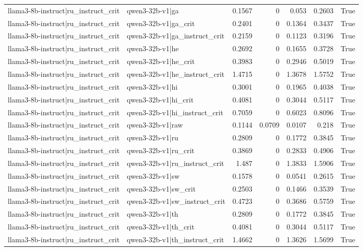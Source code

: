 \begin{table}
\begin{tabular}{l l r r r r l}
llama3-8b-instruct|ru_instruct_crit & qwen3-32b-v1|ga & 0.1567 & 0 & 0.053 & 0.2603 & True \\
llama3-8b-instruct|ru_instruct_crit & qwen3-32b-v1|ga_crit & 0.2401 & 0 & 0.1364 & 0.3437 & True \\
llama3-8b-instruct|ru_instruct_crit & qwen3-32b-v1|ga_instruct_crit & 0.2159 & 0 & 0.1123 & 0.3196 & True \\
llama3-8b-instruct|ru_instruct_crit & qwen3-32b-v1|he & 0.2692 & 0 & 0.1655 & 0.3728 & True \\
llama3-8b-instruct|ru_instruct_crit & qwen3-32b-v1|he_crit & 0.3983 & 0 & 0.2946 & 0.5019 & True \\
llama3-8b-instruct|ru_instruct_crit & qwen3-32b-v1|he_instruct_crit & 1.4715 & 0 & 1.3678 & 1.5752 & True \\
llama3-8b-instruct|ru_instruct_crit & qwen3-32b-v1|hi & 0.3001 & 0 & 0.1965 & 0.4038 & True \\
llama3-8b-instruct|ru_instruct_crit & qwen3-32b-v1|hi_crit & 0.4081 & 0 & 0.3044 & 0.5117 & True \\
llama3-8b-instruct|ru_instruct_crit & qwen3-32b-v1|hi_instruct_crit & 0.7059 & 0 & 0.6023 & 0.8096 & True \\
llama3-8b-instruct|ru_instruct_crit & qwen3-32b-v1|raw & 0.1144 & 0.0709 & 0.0107 & 0.218 & True \\
llama3-8b-instruct|ru_instruct_crit & qwen3-32b-v1|ru & 0.2809 & 0 & 0.1772 & 0.3845 & True \\
llama3-8b-instruct|ru_instruct_crit & qwen3-32b-v1|ru_crit & 0.3869 & 0 & 0.2833 & 0.4906 & True \\
llama3-8b-instruct|ru_instruct_crit & qwen3-32b-v1|ru_instruct_crit & 1.487 & 0 & 1.3833 & 1.5906 & True \\
llama3-8b-instruct|ru_instruct_crit & qwen3-32b-v1|sw & 0.1578 & 0 & 0.0541 & 0.2615 & True \\
llama3-8b-instruct|ru_instruct_crit & qwen3-32b-v1|sw_crit & 0.2503 & 0 & 0.1466 & 0.3539 & True \\
llama3-8b-instruct|ru_instruct_crit & qwen3-32b-v1|sw_instruct_crit & 0.4723 & 0 & 0.3686 & 0.5759 & True \\
llama3-8b-instruct|ru_instruct_crit & qwen3-32b-v1|th & 0.2809 & 0 & 0.1772 & 0.3845 & True \\
llama3-8b-instruct|ru_instruct_crit & qwen3-32b-v1|th_crit & 0.4081 & 0 & 0.3044 & 0.5117 & True \\
llama3-8b-instruct|ru_instruct_crit & qwen3-32b-v1|th_instruct_crit & 1.4662 & 0 & 1.3626 & 1.5699 & True \\

\end{tabular}
\end{table}
